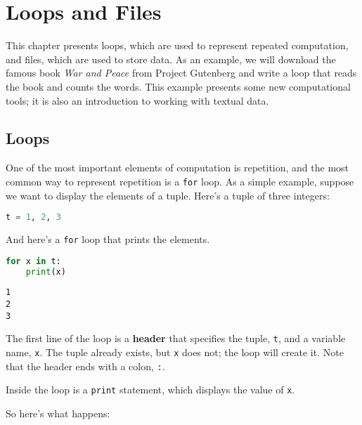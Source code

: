\hypertarget{loops-and-files}{%
\chapter{Loops and Files}\label{loops-and-files}}

This chapter presents loops, which are used to represent repeated
computation, and files, which are used to store data. As an example, we
will download the famous book \emph{War and Peace} from Project
Gutenberg and write a loop that reads the book and counts the words.
This example presents some new computational tools; it is also an
introduction to working with textual data.

\hypertarget{loops}{%
\section{Loops}\label{loops}}

One of the most important elements of computation is repetition, and the
most common way to represent repetition is a
\passthrough{\lstinline!for!} loop. As a simple example, suppose we want
to display the elements of a tuple. Here's a tuple of three integers:

\begin{lstlisting}[language=Python,style=source]
t = 1, 2, 3
\end{lstlisting}

And here's a \passthrough{\lstinline!for!} loop that prints the
elements.

\begin{lstlisting}[language=Python,style=source]
for x in t:
    print(x)
\end{lstlisting}

\begin{lstlisting}[style=output]
1
2
3
\end{lstlisting}

The first line of the loop is a \textbf{header} that specifies the
tuple, \passthrough{\lstinline!t!}, and a variable name,
\passthrough{\lstinline!x!}. The tuple already exists, but
\passthrough{\lstinline!x!} does not; the loop will create it. Note that
the header ends with a colon, \passthrough{\lstinline!:!}.

Inside the loop is a \passthrough{\lstinline!print!} statement, which
displays the value of \passthrough{\lstinline!x!}.

So here's what happens:

